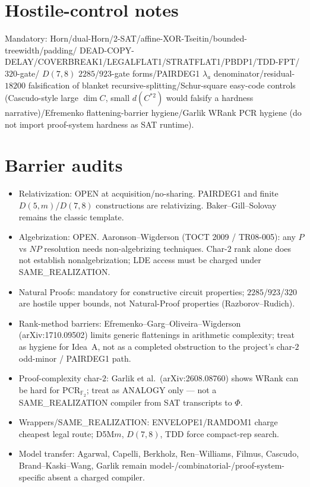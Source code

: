 \documentclass[11pt]{article}
\begin{document}
\section*{Hostile-control notes}
Mandatory: Horn/dual-Horn/2-SAT/affine-XOR-Tseitin/bounded-treewidth/padding/
DEAD-COPY-DELAY/COVERBREAK1/LEGALFLAT1/STRATFLAT1/PBDP1/TDD-FPT/$320$-gate/
$D(7,8)$ $2285$/$923$-gate forms/PAIRDEG1 $\lambda_a$ denominator/residual-$18200$
falsification of blanket recursive-splitting/Schur-square easy-code controls
(Cascudo-style large $\dim C$, small $d(C^{*2})$ would falsify a hardness
narrative)/Efremenko flattening-barrier hygiene/Garlik WRank PCR hygiene
(do not import proof-system hardness as SAT runtime).

\section*{Barrier audits}
\begin{itemize}
\item Relativization: OPEN at acquisition/no-sharing. PAIRDEG1 and finite
$D(5,m)$/$D(7,8)$ constructions are relativizing. Baker--Gill--Solovay remains
the classic template.
\item Algebrization: OPEN. Aaronson--Wigderson (TOCT 2009 / TR08-005): any
$P$ vs $NP$ resolution needs non-algebrizing techniques. Char-$2$ rank alone does
not establish nonalgebrization; LDE access must be charged under SAME\_REALIZATION.
\item Natural Proofs: mandatory for constructive circuit properties; $2285$/$923$/$320$
are hostile upper bounds, not Natural-Proof properties (Razborov--Rudich).
\item Rank-method barriers: Efremenko--Garg--Oliveira--Wigderson (arXiv:1710.09502)
limits generic flattenings in arithmetic complexity; treat as hygiene for Idea~A,
not as a completed obstruction to the project's char-$2$ odd-minor / PAIRDEG1 path.
\item Proof-complexity char-$2$: Garlik et al.\ (arXiv:2608.08760) shows WRank can
be hard for PCR$_{\mathbb F_2}$; treat as ANALOGY only --- not a SAME\_REALIZATION
compiler from SAT transcripts to $\Phi$.
\item Wrappers/SAME\_REALIZATION: ENVELOPE1/RAMDOM1 charge cheapest legal route;
D5M$m$, $D(7,8)$, TDD force compact-rep search.
\item Model transfer: Agarwal, Capelli, Berkholz, Ren--Williams, Filmus,
Cascudo, Brand--Kaski--Wang, Garlik remain model-/combinatorial-/proof-system-specific
absent a charged compiler.
\end{itemize}
\end{document}
